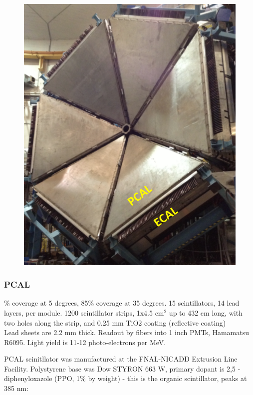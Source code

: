 			 \begin{figure}[H]
    			\centering
    			\includegraphics[width=12cm]{Chapters/Ch2-Experiment/clas-12-exp/clas-detectors/fd/pics/clas12-pcal-ecal.png}
			\end{figure}
			
			
        \subsubsection{PCAL}
                \% coverage at 5 degrees, 85\% coverage at 35 degrees. 15 scintillators, 14 lead layers, per module. 1200 scintillator strips, 1x4.5 cm$^2$ up to 432 cm long, with two holes along the strip, and 0.25 mm TiO2 coating (reflective coating)\\
                Lead sheets are 2.2 mm thick. Readout by fibers into 1 inch PMTs, Hamamatsu R6095. Light yield is 11-12 photo-electrons per MeV. 
                
                PCAL scinitllator was manufactured at the FNAL-NICADD Extrusion Line Facility. Polystyrene base was Dow STYRON 663 W, primary dopant is 2,5 -diphenyloxazole (PPO, 1\% by weight) - this is the organic scintillator, peaks at 385 nm:
                
